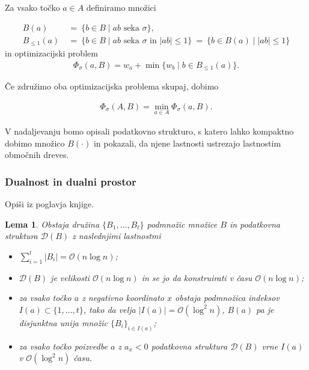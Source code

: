 \documentclass[a4paper, 12pt]{book}
\newcommand{\D}{\ensuremath{\mathcal{D}}}
\newcommand{\OO}{\ensuremath{\mathcal{O}}} %
\newtheorem{lema}[izrek]{Lema}
\begin{document}
Za vsako točko $a\in A$ definiramo množici

\begin{align*}
	B(a)~&=~\{ b\in B\mid \text{$ab$ seka $\sigma$}\},\\
	B_{\le 1}(a)~&=~ \{ b\in B\mid \text{$ab$ seka $\sigma$ in $|ab|\le 1$}\} 
			~=~ \{ b\in B(a)\mid |ab|\le 1\}
\end{align*}
in optimizacijski problem
\begin{align*}
	\Phi_\sigma(a,B) = w_a + \min \{ w_b\mid b\in B_{\le 1}(a)\}.
\end{align*}

Če združimo oba optimizacijska problema skupaj, dobimo

\begin{align*}
	\Phi_\sigma(A,B) = \min_{a\in A} \Phi_\sigma(a,B).
\end{align*}

V nadaljevanju bomo opisali podatkovno strukturo, s katero lahko kompaktno dobimo množico $B(\cdot)$ in pokazali, da njene lastnosti ustrezajo lastnostim območnih dreves.

\subsubsection{Dualnost in dualni prostor}
Opiši iz poglavja knjige.

\begin{lema}
\label{dualnost}
	Obstaja družina $\{ B_1,\dots, B_t\}$ podmnožic množice $B$ in 			podatkovna struktura $\D (B)$ z naslednjimi lastnostmi
	\begin{itemize}
		\item $\sum_{i=1}^t |B_i| = \OO(n\log n)$;
		\item $\D (B)$ je velikosti $\OO(n\log n)$ in se jo da 					konstruirati v času $\OO(n\log n)$;
		\item za vsako točko $a$ z negativno koordinato $x$ obstaja 			podmnožica indeksov $I(a)\subset \{ 1,\dots,t\}$, tako da velja 		$|I(a)|=\OO(\log^2 n)$, $B(a)$ pa je disjunktna unija množic $\{ 			B_i \}_{i\in I(a)}$;
		\item za vsako točko poizvedbe $a$ z $a_x<0$ podatkovna 				struktura $\D (B)$ vrne $I(a)$ v $\OO(\log^2 n)$ času.
	\end{itemize}
\end{lema}
\end{document}
